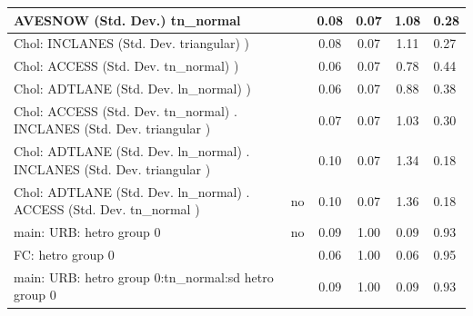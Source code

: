 \begin{table}
\begin{center}
\begin{tabular}{|l|l|c|c|c|l|}
			\hline
			AVESNOW (Std. Dev.) tn_normal &  & 0.08 & 0.07 & 1.08 & 0.28 \\
			\hline
			 Chol: INCLANES (Std. Dev. triangular) ) &  & 0.08 & 0.07 & 1.11 & 0.27 \\
			\hline
			 Chol: ACCESS (Std. Dev. tn_normal) ) &  & 0.06 & 0.07 & 0.78 & 0.44 \\
			\hline
			 Chol: ADTLANE (Std. Dev. ln_normal) ) &  & 0.06 & 0.07 & 0.88 & 0.38 \\
			\hline
			 Chol: ACCESS (Std. Dev. tn_normal) . INCLANES (Std. Dev.   triangular ) &  & 0.07 & 0.07 & 1.03 & 0.30 \\
			\hline
			 Chol: ADTLANE (Std. Dev. ln_normal) . INCLANES (Std. Dev.   triangular ) &  & 0.10 & 0.07 & 1.34 & 0.18 \\
			\hline
			 Chol: ADTLANE (Std. Dev. ln_normal) . ACCESS (Std. Dev.   tn_normal ) & no & 0.10 & 0.07 & 1.36 & 0.18 \\
			\hline
			main: URB: hetro group 0 & no & 0.09 & 1.00 & 0.09 & 0.93 \\
			\hline
			FC: hetro group 0 &  & 0.06 & 1.00 & 0.06 & 0.95 \\
			\hline
			main: URB: hetro group 0:tn_normal:sd  hetro group 0 &  & 0.09 & 1.00 & 0.09 & 0.93 \\
			\hline
		\end{tabular}
	\end{center}
\end{table}
